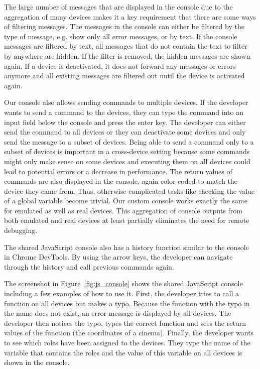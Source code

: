 The large number of messages that are displayed in the console due to the aggregation of many devices makes it a key requirement that there are some ways of filtering messages. The messages in the console can either be filtered by the type of message, e.g. show only all error messages, or by text. If the console messages are filtered by text, all messages that do not contain the text to filter by anywhere are hidden. If the filter is removed, the hidden messages are shown again. If a device is deactivated, it does not forward any messages or errors anymore and all existing messages are filtered out until the device is activated again. 

Our console also allows sending commands to multiple devices. If the developer wants to send a command to the devices, they can type the command into an input field below the console and press the enter key. The developer can either send the command to all devices or they can deactivate some devices and only send the message to a subset of devices. Being able to send a command only to a subset of devices is important in a cross-device setting because some commands might only make sense on some devices and executing them on all devices could lead to potential errors or a decrease in performance. The return values of commands are also displayed in the console, again color-coded to match the device they came from. Thus, otherwise complicated tasks like checking the value of a global variable become trivial. Our custom console works exactly the same for emulated as well as real devices. This aggregation of console outputs from both emulated and real devices at least partially eliminates the need for remote debugging.

The shared JavaScript console also has a history function similar to the console in Chrome DevTools. By using the arrow keys, the developer can navigate through the history and call previous commands again.

The screenshot in Figure~\ref{fig:js_console} shows the shared JavaScript console including a few examples of how to use it. First, the developer tries to call a function on all devices but makes a typo. Because the function with the typo in the name does not exist, an error message is displayed by all devices. The developer then notices the typo, types the correct function and sees the return values of the function (the coordinates of a cinema). Finally, the developer wants to see which roles have been assigned to the devices. They type the name of the variable that contains the roles and the value of this variable on all devices is shown in the console.

